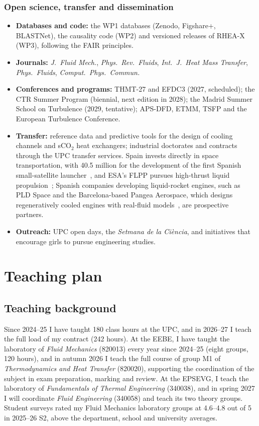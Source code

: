 \documentclass[11pt]{article}
\begin{document}
\subsubsection*{Open science, transfer and dissemination}
\begin{itemize}
  \item \textbf{Databases and code:} the WP1 databases (Zenodo, Figshare+, BLASTNet), the
  causality code (WP2) and versioned releases of RHEA-X (WP3), following the FAIR principles.
  \item \textbf{Journals:} \emph{J.\ Fluid Mech.}, \emph{Phys.\ Rev.\ Fluids}, \emph{Int.\ J.\
  Heat Mass Transfer}, \emph{Phys.\ Fluids}, \emph{Comput.\ Phys.\ Commun.}
  \item \textbf{Conferences and programs:} THMT-27 and EFDC3 (2027, scheduled); the CTR Summer
  Program (biennial, next edition in 2028); the Madrid Summer School on Turbulence (2029,
  tentative); APS-DFD, ETMM, TSFP and the European Turbulence Conference.
  \item \textbf{Transfer:} reference data and predictive tools for the design of cooling
  channels and sCO$_2$ heat exchangers; industrial doctorates and contracts through the UPC
  transfer services. Spain invests directly in space transportation, with \texteuro{}40.5
  million for the development of the first Spanish small-satellite launcher~\cite{CDTI2024},
  and ESA's FLPP pursues high-thrust liquid propulsion~\cite{ESA2026}; Spanish companies
  developing liquid-rocket engines, such as PLD Space and the Barcelona-based Pangea Aerospace,
  which designs regeneratively cooled engines with real-fluid models~\cite{Esnault2021}, are
  prospective partners.
  \item \textbf{Outreach:} UPC open days, the \emph{Setmana de la Ci\`encia}, and initiatives
  that encourage girls to pursue engineering studies.
\end{itemize}

\section{Teaching plan}\label{sec:teaching}

\subsection{Teaching background}
Since 2024--25 I have taught 180 class hours at the UPC, and in 2026--27 I teach the full
load of my contract (242 hours). At the EEBE, I have taught the laboratory of \emph{Fluid
Mechanics} (820013) every year since 2024--25 (eight groups, 120 hours), and in autumn
2026 I teach the full course of group M1 of \emph{Thermodynamics and Heat Transfer}
(820020), supporting the coordination of the subject in exam preparation, marking and
review. At the EPSEVG, I teach the laboratory of \emph{Fundamentals of Thermal
Engineering} (340038), and in spring 2027 I will coordinate \emph{Fluid Engineering}
(340058) and teach its two theory groups. Student surveys rated my Fluid Mechanics
laboratory groups at 4.6--4.8 out of 5 in 2025--26 S2, above the department, school and
university averages.
\end{document}
